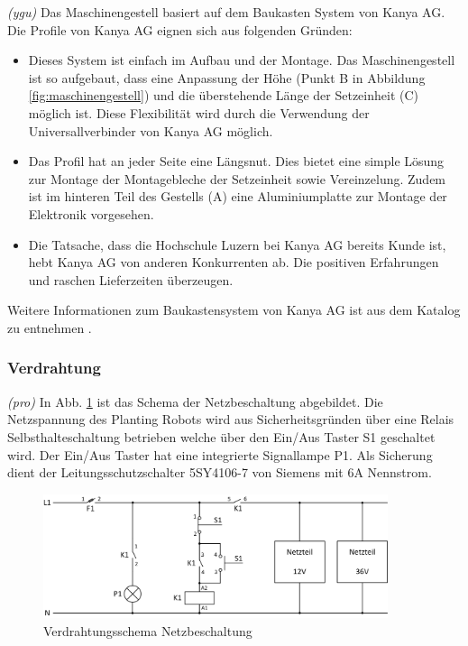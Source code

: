 \textit{(ygu)} Das Maschinengestell basiert auf dem Baukasten System von Kanya AG. Die Profile von Kanya AG eignen sich aus folgenden Gründen:
\begin{itemize}
	\item Dieses System ist einfach im Aufbau und der Montage. Das Maschinengestell ist so aufgebaut, dass eine Anpassung der Höhe (Punkt B in Abbildung \ref{fig:maschinengestell}) und die überstehende Länge der Setzeinheit (C) möglich ist. Diese Flexibilität wird durch die Verwendung der Universallverbinder von Kanya AG möglich.
	
	\item Das Profil hat an jeder Seite eine Längsnut. Dies bietet eine simple Lösung zur Montage der Montagebleche der Setzeinheit sowie Vereinzelung. Zudem ist im hinteren Teil des Gestells (A) eine Aluminiumplatte zur Montage der Elektronik vorgesehen.
	
	\item Die Tatsache, dass die Hochschule Luzern bei Kanya AG bereits Kunde ist, hebt Kanya AG von anderen Konkurrenten ab. Die positiven Erfahrungen und raschen Lieferzeiten überzeugen.
\end{itemize}
Weitere Informationen zum Baukastensystem von Kanya AG ist aus dem Katalog zu entnehmen \cite{kanya}.

\subsubsection{Verdrahtung}
\textit{(pro)} In Abb. \ref{fig:Verdrahtung} ist das Schema der Netzbeschaltung abgebildet. Die Netzspannung des Planting Robots wird aus Sicherheitsgründen über eine Relais Selbsthalteschaltung betrieben welche über den Ein/Aus Taster S1 geschaltet wird. Der Ein/Aus Taster hat eine integrierte Signallampe P1. Als Sicherung dient der Leitungsschutzschalter 5SY4106-7 von Siemens mit 6A Nennstrom.

\begin{figure}[H]
	\includegraphics[width=0.9\textwidth]{Illustrationen/6-Umsetzung/Verdrahtungsschema.png}
	\caption{Verdrahtungsschema Netzbeschaltung}
	\label{fig:Verdrahtung}
\end{figure}

